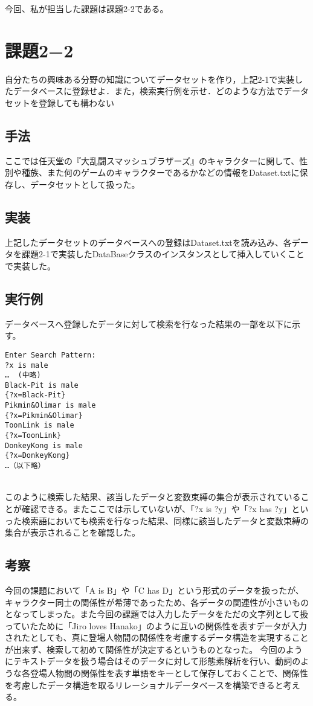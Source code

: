 \documentclass[a4j]{jarticle}
\begin{document}
今回、私が担当した課題は課題2-2である。

\section{課題2−2}
\begin{screen}
自分たちの興味ある分野の知識についてデータセットを作り，上記2-1で実装したデータベースに登録せよ．また，検索実行例を示せ．どのような方法でデータセットを登録しても構わない
\end{screen}

\subsection{手法}
ここでは任天堂の『大乱闘スマッシュブラザーズ』のキャラクターに関して、性別や種族、また何のゲームのキャラクターであるかなどの情報をDataset.txtに保存し、データセットとして扱った。

\subsection{実装}
上記したデータセットのデータベースへの登録はDataset.txtを読み込み、各データを課題2-1で実装したDataBaseクラスのインスタンスとして挿入していくことで実装した。

\subsection{実行例}
データベースへ登録したデータに対して検索を行なった結果の一部を以下に示す。
\\

\begin{screen}
\begin{verbatim}
Enter Search Pattern:
?x is male
…  (中略)
Black-Pit is male
{?x=Black-Pit}
Pikmin&Olimar is male
{?x=Pikmin&Olimar}
ToonLink is male
{?x=ToonLink}
DonkeyKong is male
{?x=DonkeyKong}
…（以下略）
\end{verbatim}
\end{screen}
\\

このように検索した結果、該当したデータと変数束縛の集合が表示されていることが確認できる。またここでは示していないが、「?x is ?y」や「?x has ?y」といった検索語においても検索を行なった結果、同様に該当したデータと変数束縛の集合が表示されることを確認した。
\subsection{考察}
今回の課題において「A is B」や「C has D」という形式のデータを扱ったが、キャラクター同士の関係性が希薄であったため、各データの関連性が小さいものとなってしまった。また今回の課題では入力したデータをただの文字列として扱っていたために「Jiro loves Hanako」のように互いの関係性を表すデータが入力されたとしても、真に登場人物間の関係性を考慮するデータ構造を実現することが出来ず、検索して初めて関係性が決定するというものとなった。
今回のようにテキストデータを扱う場合はそのデータに対して形態素解析を行い、動詞のような各登場人物間の関係性を表す単語をキーとして保存しておくことで、関係性を考慮したデータ構造を取るリレーショナルデータベースを構築できると考える。
\end{document}
